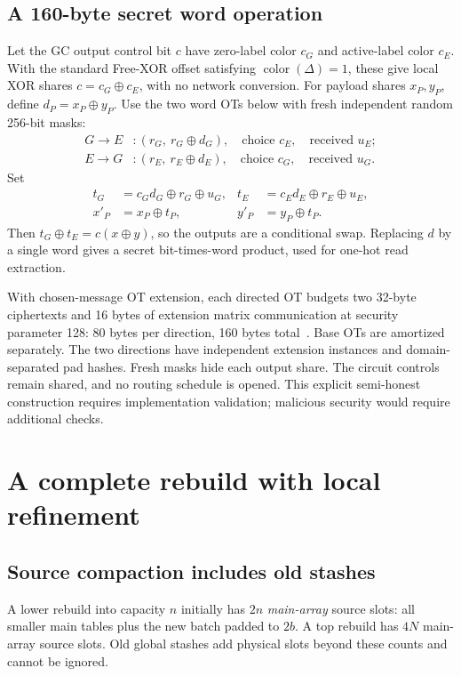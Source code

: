 \documentclass[11pt]{article}
\newcommand{\xor}{\mathbin{\oplus}}
\begin{document}
\subsection{A 160-byte secret word operation}
Let the GC output control bit $c$ have zero-label color $c_G$ and active-label
color $c_E$. With the standard Free-XOR offset satisfying
$\operatorname{color}(\Delta)=1$, these give local XOR shares
$c=c_G\xor c_E$, with no network
conversion. For payload shares $x_P,y_P$, define $d_P=x_P\xor y_P$.
Use the two word OTs below with fresh independent random 256-bit masks:
\begin{align*}
 G\longrightarrow E &: (r_G,\ r_G\xor d_G),\quad\text{choice }c_E,
                   \quad\text{received }u_E;\\
 E\longrightarrow G &: (r_E,\ r_E\xor d_E),\quad\text{choice }c_G,
                   \quad\text{received }u_G.
\end{align*}
Set
\begin{align*}
 t_G&=c_Gd_G\xor r_G\xor u_G,&
 t_E&=c_Ed_E\xor r_E\xor u_E,\\
 x'_P&=x_P\xor t_P,& y'_P&=y_P\xor t_P.
\end{align*}
Then $t_G\xor t_E=c(x\xor y)$, so the outputs are a conditional swap.
Replacing $d$ by a single word gives a secret bit-times-word product,
used for one-hot read extraction.

With chosen-message OT extension, each directed OT budgets two 32-byte
ciphertexts and 16 bytes of extension matrix communication at security
parameter 128: 80 bytes per direction, 160 bytes total~\cite{iknp}.
Base OTs are amortized separately. The two directions have independent
extension instances and domain-separated pad hashes. Fresh masks hide each
output share. The circuit controls remain shared, and no routing schedule
is opened. This explicit semi-honest construction requires implementation
validation; malicious security would require additional checks.

\section{A complete rebuild with local refinement}\label{sec:rebuild}
\subsection{Source compaction includes old stashes}
A lower rebuild into capacity $n$ initially has $2n$ \emph{main-array}
source slots: all smaller main tables plus the new batch padded to $2b$.
A top rebuild has $4N$ main-array source slots. Old global stashes add
physical slots beyond these counts and cannot be ignored.
\end{document}
